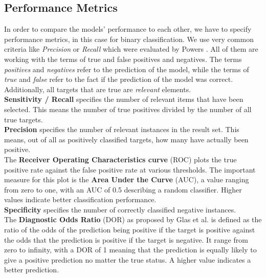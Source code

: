 \documentclass[conference,comsoc]{IEEEtran}
\begin{document}
\subsection{Performance Metrics}
In order to compare the models' performance to each other, we have to specify performance metrics, in this case for binary classification.
We use very common criteria like \emph{Precision} or \emph{Recall} which were evaluated by Powers \cite{powers2011evaluation}.
All of them are working with the terms of true and false positives and negatives.
The terms \emph{positives} and \emph{negatives} refer to the prediction of the model, while the terms of \emph{true} and \emph{false} refer to the fact if the prediction of the model was correct.
Additionally, all targets that are true are \emph{relevant} elements. \\
\textbf{Sensitivity / Recall} specifies the number of relevant items that have been selected.
This means the number of true positives divided by the number of all true targets. \\
\textbf{Precision} specifies the number of relevant instances in the result set.
This means, out of all as positively classified targets, how many have actually been positive. \\
The \textbf{Receiver Operating Characteristics curve} (ROC) plots the true positive rate against the false positive rate at various thresholds.
The important measure for this plot is the \textbf{Area Under the Curve} (AUC), a value ranging from zero to one, with an AUC of 0.5 describing a random classifier.
Higher values indicate better classification performance. \\
\textbf{Specificity} specifies the number of correctly classified negative instances. \\
The \textbf{Diagnostic Odds Ratio} (DOR) as proposed by Glas et al.\cite{glas2003diagnostic} is defined as the ratio of the odds of the prediction being positive if the target is positive against the odds that the prediction is positive if the target is negative.
It range from zero to infinity, with a DOR of 1 meaning that the prediction is equally likely to give a positive prediction no matter the true status.
A higher value indicates a better prediction.
\end{document}

